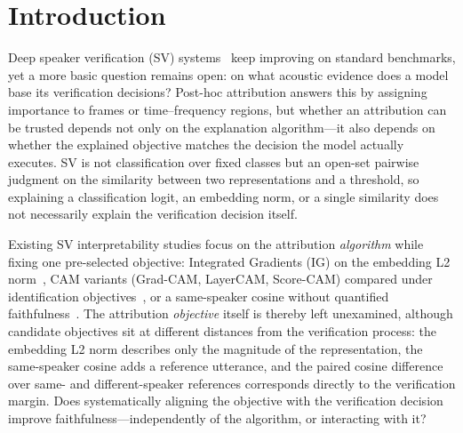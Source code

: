 \documentclass{article}
\begin{document}
\section{Introduction}
\label{sec:intro}

Deep speaker verification (SV) systems~\cite{ECAPATDNNEmphasizedChannel2020a} keep improving on standard benchmarks, yet a more basic question remains open: on what acoustic evidence does a model base its verification decisions? Post-hoc attribution answers this by assigning importance to frames or time--frequency regions, but whether an attribution can be trusted depends not only on the explanation algorithm---it also depends on whether the explained objective matches the decision the model actually executes. SV is not classification over fixed classes but an open-set pairwise judgment on the similarity between two representations and a threshold, so explaining a classification logit, an embedding norm, or a single similarity does not necessarily explain the verification decision itself.

Existing SV interpretability studies focus on the attribution \emph{algorithm} while fixing one pre-selected objective: Integrated Gradients (IG) on the embedding L2 norm~\cite{zhang2023visualizing}, CAM variants (Grad-CAM, LayerCAM, Score-CAM) compared under identification objectives~\cite{li2022reliable,li2024phonemes}, or a same-speaker cosine without quantified faithfulness~\cite{thebaud2024phonetic}. The attribution \emph{objective} itself is thereby left unexamined, although candidate objectives sit at different distances from the verification process: the embedding L2 norm describes only the magnitude of the representation, the same-speaker cosine adds a reference utterance, and the paired cosine difference over same- and different-speaker references corresponds directly to the verification margin. Does systematically aligning the objective with the verification decision improve faithfulness---independently of the algorithm, or interacting with it?
\end{document}
